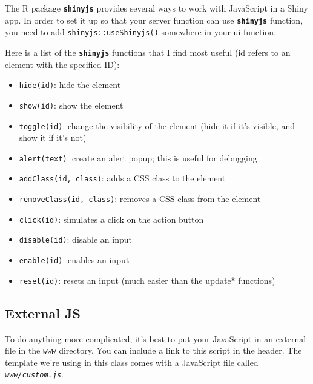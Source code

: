 \documentclass[
  oneside]{book}
\newenvironment{Shaded}{\begin{snugshade}}{\end{snugshade}}
\newcommand{\AttributeTok}[1]{\textcolor[rgb]{0.77,0.63,0.00}{#1}}
\newcommand{\FunctionTok}[1]{\textcolor[rgb]{0.00,0.00,0.00}{#1}}
\newcommand{\NormalTok}[1]{#1}
\newcommand{\SpecialCharTok}[1]{\textcolor[rgb]{0.00,0.00,0.00}{#1}}
\newcommand{\StringTok}[1]{\textcolor[rgb]{0.31,0.60,0.02}{#1}}
\providecommand{\tightlist}{%
  \setlength{\itemsep}{0pt}\setlength{\parskip}{0pt}}
\begin{document}
The R package \textbf{\texttt{shinyjs}} provides several ways to work with JavaScript in a Shiny app. In order to set it up so that your server function can use \textbf{\texttt{shinyjs}} function, you need to add \texttt{shinyjs::useShinyjs}\texttt{()} somewhere in your ui function.

Here is a list of the \textbf{\texttt{shinyjs}} functions that I find most useful (\AttributeTok{id} refers to an element with the specified ID):

\begin{itemize}
\tightlist
\item
  \texttt{hide}\texttt{(id)}: hide the element
\item
  \texttt{show}\texttt{(id)}: show the element
\item
  \texttt{toggle}\texttt{(id)}: change the visibility of the element (hide it if it's visible, and show it if it's not)
\item
  \texttt{alert}\texttt{(text)}: create an alert popup; this is useful for debugging
\item
  \texttt{addClass}\texttt{(id,\ class)}: adds a CSS class to the element
\item
  \texttt{removeClass}\texttt{(id,\ class)}: removes a CSS class from the element
\item
  \texttt{click}\texttt{(id)}: simulates a click on the action button
\item
  \texttt{disable}\texttt{(id)}: disable an input
\item
  \texttt{enable}\texttt{(id)}: enables an input
\item
  \texttt{reset}\texttt{(id)}: resets an input (much easier than the update* functions)
\end{itemize}

\hypertarget{external-js}{%
\subsection{External JS}\label{external-js}}

To do anything more complicated, it's best to put your JavaScript in an external file in the \textit{\texttt{www}} directory. You can include a link to this script in the header. The template we're using in this class comes with a JavaScript file called \textit{\texttt{www/custom.js}}.

\begin{Shaded}
\end{Shaded}
\end{document}

